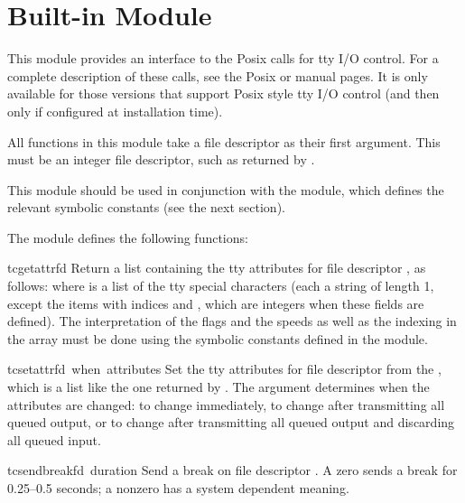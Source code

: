 \section{Built-in Module }

\renewcommand{\indexsubitem}{(in module termios)}

This module provides an interface to the Posix calls for tty I/O
control.  For a complete description of these calls, see the Posix or
\UNIX{} manual pages.  It is only available for those \UNIX{} versions
that support Posix  style tty I/O control (and then
only if configured at installation time).

All functions in this module take a file descriptor  as their
first argument.  This must be an integer file descriptor, such as
returned by .

This module should be used in conjunction with the 
module, which defines the relevant symbolic constants (see the next
section).

The module defines the following functions:

\begin{funcdesc}{tcgetattr}{fd}
Return a list containing the tty attributes for file descriptor
, as follows:  where  is
a list of the tty special characters (each a string of length 1,
except the items with indices  and , which are
integers when these fields are defined).  The interpretation of the
flags and the speeds as well as the indexing in the  array
must be done using the symbolic constants defined in the
 module.
\end{funcdesc}

\begin{funcdesc}{tcsetattr}{fd\, when\, attributes}
Set the tty attributes for file descriptor  from the
, which is a list like the one returned by
.  The  argument determines when the
attributes are changed:  to change immediately,
 to change after transmitting all queued
output, or  to change after transmitting all
queued output and discarding all queued input.
\end{funcdesc}

\begin{funcdesc}{tcsendbreak}{fd\, duration}
Send a break on file descriptor .  A zero  sends
a break for 0.25--0.5 seconds; a nonzero  has a system
dependent meaning.
\end{funcdesc}

